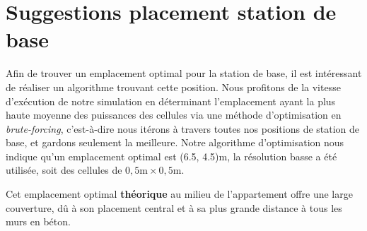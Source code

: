 %
%
%


\section{Suggestions placement station de base}

Afin de trouver un emplacement optimal pour la station de base, il est intéressant de réaliser un algorithme trouvant cette position. Nous profitons de la vitesse d'exécution de notre simulation en déterminant l'emplacement ayant la plus haute moyenne des puissances des cellules via une méthode d'optimisation en \textit{brute-forcing}, c'est-à-dire nous itérons à travers toutes nos positions de station de base, et gardons seulement la meilleure. Notre algorithme d'optimisation nous indique qu'un emplacement optimal est (6.5, 4.5)m, la résolution basse a été utilisée, soit des cellules de $0,5\mathrm{m}\times0,5\mathrm{m}$.

Cet emplacement optimal \textbf{théorique} au milieu de l'appartement offre une large couverture, dû à son placement central et à sa plus grande distance à tous les murs en béton.


